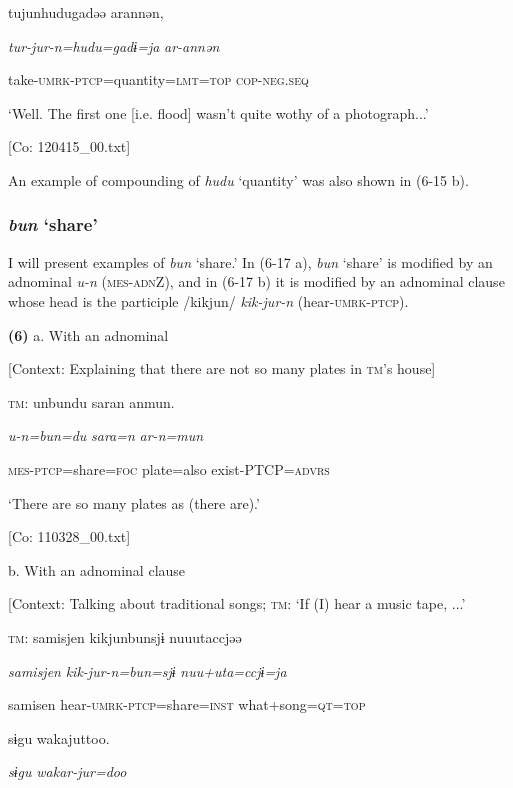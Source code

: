     tujunhudugadəə  arannən,

    \textit{tur-jur-n=hudu=gadɨ=ja}  \textit{ar-annən}

    take-\textsc{umrk}-\textsc{ptcp}=quantity=\textsc{lmt}=\textsc{top}  \textsc{cop}-\textsc{neg}.\textsc{seq}

    ‘Well. The first one [i.e. flood] wasn’t quite wothy of a photograph...’

    [Co: 120415\_00.txt]

An example of compounding of \textit{hudu} ‘quantity’ was also shown in (6-15 b).

\subsubsection{\textit{bun} ‘share’}

I will present examples of \textit{bun} ‘share.’ In (6-17 a), \textit{bun} ‘share’ is modified by an adnominal \textit{u-n} (\textsc{mes}-\textsc{adn}Z), and in (6-17 b) it is modified by an adnominal clause whose head is the participle /kikjun/ \textit{kik-jur-n} (hear-\textsc{umrk}-\textsc{ptcp}).

\textbf{(6)}  a.  With an adnominal

    [Context: Explaining that there are not so many plates in \textsc{tm}’s house]

    \textsc{tm}:  unbundu  saran  anmun.

      \textit{u-n=bun=du}  \textit{sara=n}  \textit{ar-n=mun}

      \textsc{mes}-\textsc{ptcp}=share=\textsc{foc}  plate=also  exist-PTCP=\textsc{advrs}

      ‘There are so many plates as (there are).’

      [Co: 110328\_00.txt]

  b.  With an adnominal clause

    [Context: Talking about traditional songs; \textsc{tm}: ‘If (I) hear a music tape, ...’

    \textsc{tm}:  samisjen  kikjunbunsjɨ  nuuutaccjəə

      \textit{samisjen}  \textit{kik-jur-n=bun=sjɨ}  \textit{nuu+uta=ccjɨ=ja}

      samisen  hear-\textsc{umrk}-\textsc{ptcp}=share=\textsc{inst}  what+song=\textsc{qt}=\textsc{top}

      sɨgu  wakajuttoo.

      \textit{sɨgu}  \textit{wakar-jur=doo}

